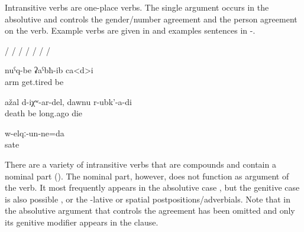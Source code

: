 Intransitive verbs are one-place verbs. The single argument occurs in the absolutive and controls the gender/number agreement and the person agreement on the verb. Example verbs are given in  and examples sentences in -. 
%
\begin{exe}
	\ex	\label{ex:intransitiveverbs}
	\begin{xlist}
		\ex	{}\slash{} 
		\ex	{}\slash{} 
		\ex	{}\slash{} 
		\ex	{}\slash{} 
		\ex	{}\slash{} 
		\ex	{}\slash{} 
		\ex	{}\slash{}  
		\ex	{} 
		\ex	{} 
		\ex	{} 	
	\end{xlist}

	\ex	\label{ex:My arms got tired}
	\gll	nuˁq-be	ʡaˁbħ-ib ca<d>i\\
		arm	get.tired be\\
	\glt	{}

	\ex	\label{ex:If it was (the time) to die, I would have died long ago}
	\gll	ažal	d-iχʷ-ar-del,	dawnu	r-ubk'-a-di\\
		death	be	long.ago	die\\
	\glt	{}

	\ex	\label{ex:I got fed up}
	\gll	w-elqː-un-ne=da\\
		sate\\
	\glt	{}

\end{exe}

There are a variety of intransitive verbs that are compounds and contain a nominal part (). The nominal part, however, does not function as argument of the verb. It most frequently appears in the absolutive case , but the genitive case is also possible , or the -lative or spatial postpositions/adverbials. Note that in  the absolutive argument that controls the agreement has been omitted and only its genitive modifier appears in the clause.

